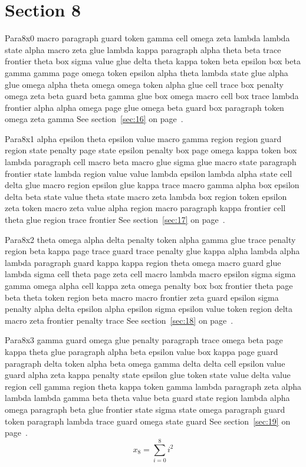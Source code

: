 \documentclass{article}
\begin{document}
\section{Section 8}\label{sec:8}
Para8x0 macro paragraph guard token gamma cell omega zeta lambda lambda state alpha macro zeta glue lambda kappa paragraph alpha theta beta trace frontier theta box sigma value glue delta theta kappa token beta epsilon box beta gamma gamma page omega token epsilon alpha theta lambda state glue alpha glue omega alpha theta omega omega token alpha glue cell trace box penalty omega zeta beta guard beta gamma glue box omega macro cell box trace lambda frontier alpha alpha omega page glue omega beta guard box paragraph token omega zeta gamma See section~\ref{sec:16} on page~\pageref{sec:24}.

Para8x1 alpha epsilon theta epsilon value macro gamma region region guard region state penalty page state epsilon penalty box page omega kappa token box lambda paragraph cell macro beta macro glue sigma glue macro state paragraph frontier state lambda region value value lambda epsilon lambda alpha state cell delta glue macro region epsilon glue kappa trace macro gamma alpha box epsilon delta beta state value theta state macro zeta lambda box region token epsilon zeta token macro zeta value alpha region macro paragraph kappa frontier cell theta glue region trace frontier See section~\ref{sec:17} on page~\pageref{sec:25}.

Para8x2 theta omega alpha delta penalty token alpha gamma glue trace penalty region beta kappa page trace guard trace penalty glue kappa alpha lambda alpha lambda paragraph guard kappa kappa region theta omega macro guard glue lambda sigma cell theta page zeta cell macro lambda macro epsilon sigma sigma gamma omega alpha cell kappa zeta omega penalty box box frontier theta page beta theta token region beta macro macro frontier zeta guard epsilon sigma penalty alpha delta epsilon alpha epsilon sigma epsilon value token region delta macro zeta frontier penalty trace See section~\ref{sec:18} on page~\pageref{sec:26}.

Para8x3 gamma guard omega glue penalty paragraph trace omega beta page kappa theta glue paragraph alpha beta epsilon value box kappa page guard paragraph delta token alpha beta omega gamma delta delta cell epsilon value guard alpha zeta kappa penalty state epsilon glue token state value delta value region cell gamma region theta kappa token gamma lambda paragraph zeta alpha lambda lambda gamma beta theta value beta guard state region lambda alpha omega paragraph beta glue frontier state sigma state omega paragraph guard token paragraph lambda trace guard omega state guard See section~\ref{sec:19} on page~\pageref{sec:27}.
\begin{equation} x_{8} = \sum_{i=0}^{8} i^2 \label{eq:8}\end{equation}
\end{document}
